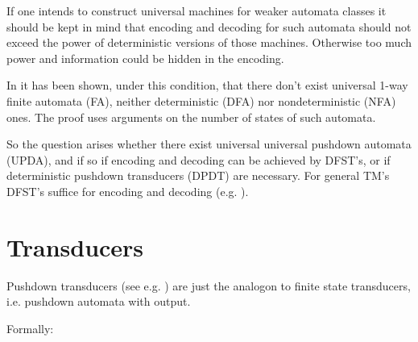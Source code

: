 \documentclass{eptcs}
\begin{document}
If one intends to construct universal machines for weaker automata classes it
should be kept in mind that encoding and decoding for such automata should not
exceed the power of deterministic versions of those machines. Otherwise too
much power and information could be hidden in the encoding.

In \cite{Kud} it has been shown, under this condition, that there don't exist universal
1-way finite automata (FA),  neither deterministic (DFA) nor nondeterministic (NFA) ones. The proof uses arguments on the
number of states of such automata.

So the question arises whether there exist universal universal pushdown automata (UPDA), and if so if
encoding and decoding can be achieved by DFST's, or if deterministic pushdown
transducers (DPDT) are necessary. For general TM's DFST's suffice for encoding
and decoding (e.g. \cite{Min}).

\section{Transducers}

 Pushdown transducers (see e.g. \cite{Gin,Gur}) are just the analogon
to finite state transducers, i.e. pushdown automata with output.

\bigskip\noindent
Formally:
\end{document}
